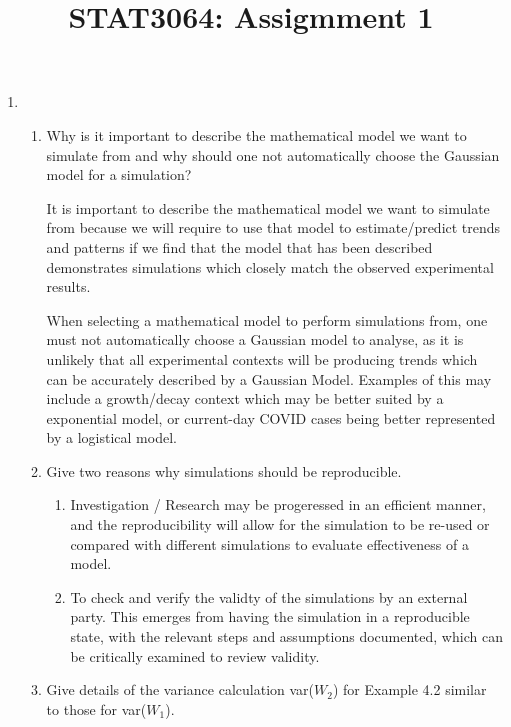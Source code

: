 \documentclass[
]{article}
\title{STAT3064: Assigmment 1}
\author{}
\date{\vspace{-2.5em}}
\begin{document}
\maketitle

\begin{enumerate}
\def\labelenumi{\arabic{enumi}.}
\item
  \begin{enumerate}
  \def\labelenumii{\alph{enumii})}
  \item
    Why is it important to describe the mathematical model we want to
    simulate from and why should one not automatically choose the
    Gaussian model for a simulation?

    It is important to describe the mathematical model we want to
    simulate from because we will require to use that model to
    estimate/predict trends and patterns if we find that the model that
    has been described demonstrates simulations which closely match the
    observed experimental results.

    When selecting a mathematical model to perform simulations from, one
    must not automatically choose a Gaussian model to analyse, as it is
    unlikely that all experimental contexts will be producing trends
    which can be accurately described by a Gaussian Model. Examples of
    this may include a growth/decay context which may be better suited
    by a exponential model, or current-day COVID cases being better
    represented by a logistical model.
  \item
    Give two reasons why simulations should be reproducible.

    \begin{enumerate}
    \def\labelenumiii{\arabic{enumiii}.}
    \item
      Investigation / Research may be progeressed in an efficient
      manner, and the reproducibility will allow for the simulation to
      be re-used or compared with different simulations to evaluate
      effectiveness of a model.
    \item
      To check and verify the validty of the simulations by an external
      party. This emerges from having the simulation in a reproducible
      state, with the relevant steps and assumptions documented, which
      can be critically examined to review validity.
    \end{enumerate}
  \item
    Give details of the variance calculation var(\(W_2\)) for Example
    4.2 similar to those for var(\(W_1\)).


\end{enumerate}
\end{enumerate}
\end{document}
